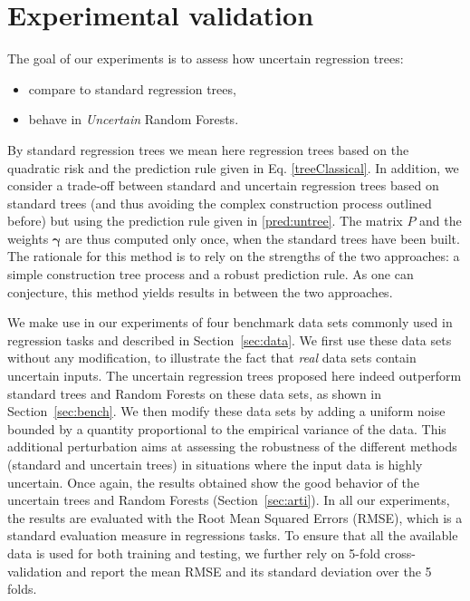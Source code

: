 \section{Experimental validation}
\label{sec:exps}


The goal of our experiments is to assess how uncertain regression trees:
%
\begin{itemize}
    \item compare to standard regression trees,
    \item behave in \textit{Uncertain} Random Forests.
\end{itemize}
%
By standard regression trees we mean here regression trees based on the quadratic risk and the prediction rule given in Eq. \eqref{treeClassical}. In addition, we consider a trade-off between standard and uncertain regression trees based on standard trees (and thus avoiding the complex construction process outlined before) but using the prediction rule given in \eqref{pred:untree}. The matrix $P$ and the weights $\boldsymbol{\gamma}$ are thus computed only once, when the standard trees have been built. The rationale for this method is to rely on the strengths of the two approaches: a simple construction tree process and a robust prediction rule. As one can conjecture, this method yields results in between the two approaches.

We make use in our experiments of four benchmark data sets commonly used in regression tasks and described in Section~\ref{sec:data}. We first use these data sets without any modification, to illustrate the fact that \textit{real} data sets contain uncertain inputs. The uncertain regression trees proposed here indeed outperform standard trees and Random Forests on these data sets, as shown in Section~\ref{sec:bench}. We then modify these data sets by adding a uniform noise bounded by a quantity proportional to the empirical variance of the data. This additional perturbation aims at assessing the robustness of the different methods (standard and uncertain trees) in situations where the input data is highly uncertain. Once again, the results obtained show the good behavior of the uncertain trees and Random Forests (Section~\ref{sec:arti}). In all our experiments, the results are evaluated with the Root Mean Squared Errors (RMSE), which is a standard evaluation measure in regressions tasks. To ensure that all the available data is used for both training and testing, we further rely on 5-fold cross-validation and report the mean RMSE and its standard deviation over the 5 folds.

